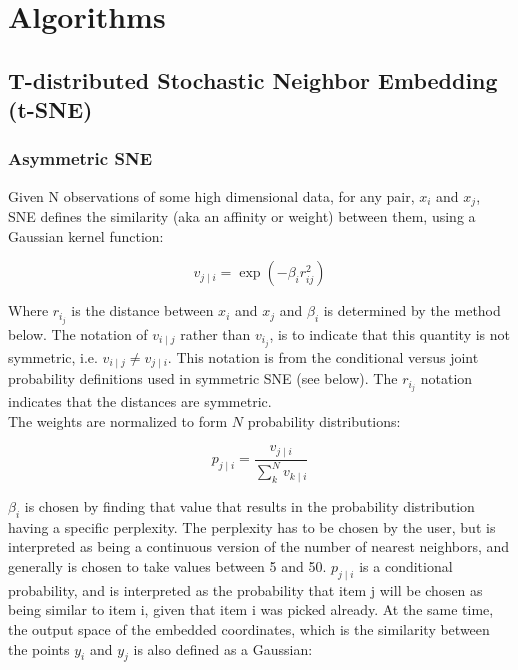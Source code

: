 \part{Algorithms} \label{part:three algorithms}

\chapter{T-distributed Stochastic Neighbor Embedding (t-SNE)}

\section{Asymmetric SNE}

Given N observations of some high dimensional data, for any pair, $x_i$ and $x_j$, SNE defines the similarity (aka an affinity or weight) between them, using a Gaussian kernel function:

\begin{equation*}
    {v_{j\mid i}} = \exp {(-\beta_i r^2_{ij})} 
\end{equation*}

\noindent Where $r_i_j$ is the distance between $x_i$ and $x_j$ and $\beta_i$ is determined by the method below. The notation of $v_{i \mid j}$ rather than $v_i_j$, is to indicate that this quantity is not symmetric, i.e. $v_{i \mid j} \neq v_{j \mid i}$. This notation is from the conditional versus joint probability definitions used in symmetric SNE (see below). The $r_i_j$ notation indicates that the distances are symmetric.\\

\noindent The weights are normalized to form $N$ probability distributions:

\begin{equation*}
    {p_{j\mid i}} = \frac {v_{j\mid i}} {\sum_k^N v_{k\mid i}}
\end{equation*}

\noindent $\beta_i$ is chosen by finding that value that results in the probability distribution having a specific perplexity. The perplexity has to be chosen by the user, but is interpreted as being a continuous version of the number of nearest neighbors, and generally is chosen to take values between 5 and 50. $p_{j\mid i}$ is a conditional probability, and is interpreted as the probability that item j will be chosen as being similar to item i, given that item i was picked already. At the same time, the output space of the embedded coordinates, which is the similarity between the points $y_i$ and $y_j$ is also defined as a Gaussian:


